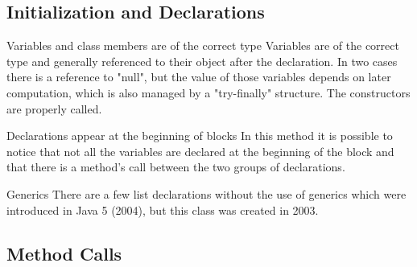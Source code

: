 \documentclass[9pt]{beamer}
\makeatletter
\newcommand*{\currentname}{\@currentlabelname}
\makeatother
\begin{document}
\subsection{Initialization and Declarations}
\begin{frame}[allowframebreaks]{\currentname}

\begin{exampleblock}{Variables and class members are of the correct type}
Variables are of the correct type and generally referenced to their object after the declaration. 
In two cases there is a reference to "null", but the value of those variables depends on later computation, which is also managed by a "try-finally" structure. The constructors are properly called.

\end{exampleblock}

\begin{alertblock}{Declarations appear at the beginning of blocks}
In this method it is possible to notice that not all the variables are declared at the beginning of the block and that there is a method's call between the two groups of declarations.
\end{alertblock}

\begin{block}{Generics}
There are a few list declarations without the use of generics which were introduced in Java 5 (2004), but this class was created in 2003.
\end{block}

\end{frame}
\subsection{Method Calls}
\end{document}
